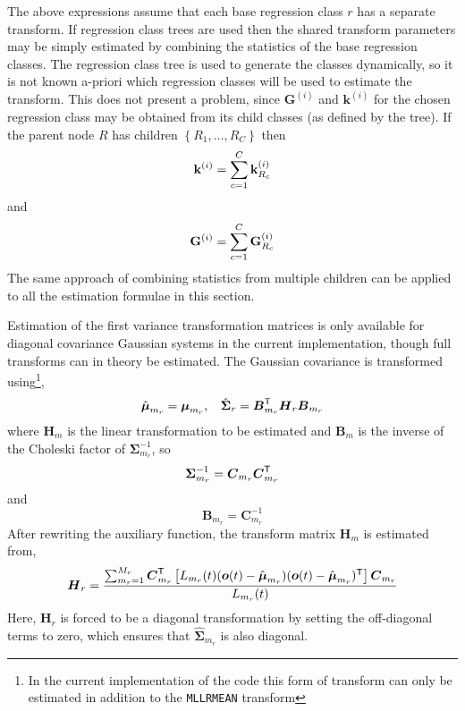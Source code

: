 The above expressions assume that each base regression class $r$ has a
separate transform. If regression class trees are used then the shared
transform parameters may be simply estimated by combining the
statistics of the base regression classes.  The regression class tree
is used to generate the classes dynamically, so it is not known
a-priori which regression classes will be used to estimate the
transform. This does not present a problem, since $\bm{G}^{(i)}$ and
$\bm{k}^{(i)}$ for the chosen regression class may be obtained from its
child classes (as defined by the tree). If the parent node $R$ has
children $\left\{R_1,\dots,R_C\right\}$ then
\[
        {\bf k}^{(i)} = \sum_{c=1}^{C} {\bf k}^{(i)}_{R_c}
\]
and
\[
        {\bf G}^{(i)} = \sum_{c=1}^{C} {\bf G}^{(i)}_{R_c}
\]
The same approach of combining statistics from multiple children can
be applied to all the estimation formulae in this section.


Estimation of the first variance transformation matrices is only available
for diagonal covariance Gaussian systems in the current implementation,
though full transforms can in theory be estimated. The Gaussian covariance is
transformed using\footnote{In the current implementation of the code this
form of transform can only be estimated in addition to the {\tt MLLRMEAN} 
transform},
\[
        \hat{{\mbox{\boldmath $\mu$}}}_{m_r} = {\mbox{\boldmath $\mu$}}_{m_r}, \:\:\:\: 
        \hat{{\mbox{\boldmath $\Sigma$}}}_{r} = {\mbox{\boldmath $B$}}_{m_r}^{\scriptstyle\sf T}{\mbox{\boldmath $H$}}_r{\mbox{\boldmath $B$}}_{m_r}
\]
where $\bm{H}_m$ is the linear transformation to be estimated and
$\bm{B}_m$ is the inverse of the Choleski factor of $\bm{\Sigma}_{m_r}^{-1}$,
so
\[ 
        {\mbox{\boldmath $\Sigma$}}_{m_r}^{-1} = {\mbox{\boldmath $C$}}_{m_r}{\mbox{\boldmath $C$}}_{m_r}^{\scriptstyle\sf T}
\]
and
\[
        \bm{B}_{m_r} = \bm{C}_{m_r}^{-1}
\]
After rewriting the auxiliary function, the transform matrix $\bm{H}_m$
is estimated from,
\[
        {\mbox{\boldmath $H$}}_r = \frac{ \sum_{m_r=1}^{M_r}{\mbox{\boldmath $C$}}_{m_r}^{\scriptstyle\sf T} \left[
                          L_{m_r}(t)({\mbox{\boldmath $o$}}(t) - \hat{{\mbox{\boldmath $\mu$}}}_{m_r})
                          ({\mbox{\boldmath $o$}}(t) - \hat{{\mbox{\boldmath $\mu$}}}_{m_r})^{\scriptstyle\sf T} \right]
                          {\mbox{\boldmath $C$}}_{m_r} } { L_{m_r}(t) }
\]
Here, $\bm{H}_r$ is forced to be a diagonal transformation by setting
the off-diagonal terms to zero, which ensures that
$\hat{\bm{\Sigma}}_{m_r}$ is also diagonal.


